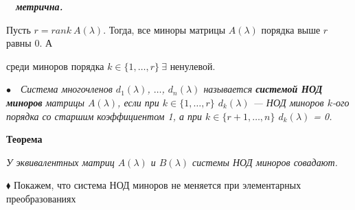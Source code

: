 \documentclass[a4paper, 12pt]{report}
\begin{document}
	$\quad$\textit{\textbf{метрична.}}
	
	\par\bigskip
	Пусть $r = rank \ A(\lambda)$. Тогда, все миноры матрицы $A(\lambda)$ порядка выше $r$ равны 0. А 
	
	среди миноров порядка $k \in \{1, \dots, r\} \ \exists$ ненулевой.
	\par\bigskip
	$\bullet$\ \ \textit{Система многочленов $d_1(\lambda)$, $\dots$, $d_n(\lambda)$ называется \textbf{системой НОД миноров} матрицы $A(\lambda)$, если при $k \in \{1, \dots, r\}$ $d_k(\lambda)$ --- НОД миноров $k$-ого порядка со старшим}
	\textit{коэффициентом 1, а при $k \in \{r+1, \dots, n\}$ $d_k(\lambda)$ = 0.}
	
	\par\bigskip
	\textbf{Теорема}
	
	\textit{У эквивалентных матриц $A(\lambda)$ и $B(\lambda)$ системы НОД миноров совадают.}
	\par\bigskip
	$\blacklozenge$ Покажем, что система НОД миноров не меняется при элементарных преобразованиях 
	
\end{document}
